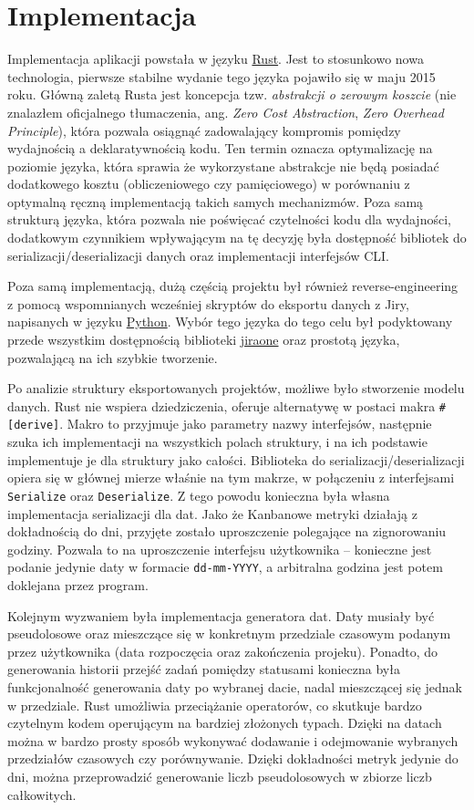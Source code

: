 \section{Implementacja}
Implementacja aplikacji powstała w języku \href{https://www.rust-lang.org/}{Rust}.
Jest to stosunkowo nowa technologia, pierwsze stabilne wydanie tego języka pojawiło się w maju 2015 roku.
Główną zaletą Rusta jest koncepcja tzw. \textit{abstrakcji o zerowym koszcie} (nie znalazłem oficjalnego tłumaczenia, ang. \textit{Zero Cost Abstraction}, \textit{Zero Overhead Principle}), która pozwala
osiągnąć zadowalający kompromis pomiędzy wydajnością a deklaratywnością kodu. Ten termin oznacza optymalizację na poziomie języka, która sprawia że wykorzystane abstrakcje nie będą posiadać dodatkowego kosztu (obliczeniowego czy pamięciowego) w porównaniu
z optymalną ręczną implementacją takich samych mechanizmów.
Poza samą strukturą języka, która pozwala nie poświęcać czytelności kodu dla wydajności, dodatkowym czynnikiem wpływającym na tę decyzję była dostępność bibliotek do serializacji/deserializacji danych oraz implementacji interfejsów CLI. \cite{RustSerde} \cite{RustClap}

Poza samą implementacją, dużą częścią projektu był również reverse-engineering z pomocą wspomnianych wcześniej skryptów do eksportu danych z Jiry, napisanych w języku \href{https://www.python.org/}{Python}.
Wybór tego języka do tego celu był podyktowany przede wszystkim dostępnością biblioteki \href{https://pypi.org/project/jiraone/}{jiraone} oraz prostotą języka, pozwalającą na ich szybkie tworzenie.

Po analizie struktury eksportowanych projektów, możliwe było stworzenie modelu danych.
Rust nie wspiera dziedziczenia, oferuje alternatywę w postaci makra \texttt{\#[derive]}. Makro to przyjmuje jako parametry
nazwy interfejsów, następnie szuka ich implementacji na wszystkich polach struktury, i na ich podstawie implementuje je dla struktury jako
całości.
Biblioteka do serializacji/deserializacji opiera się w głównej mierze właśnie na tym makrze, w połączeniu z interfejsami \texttt{Serialize} oraz \texttt{Deserialize}.
Z tego powodu konieczna była własna implementacja serializacji dla dat.
Jako że Kanbanowe metryki działają z dokładnością do dni, przyjęte zostało uproszczenie polegające na zignorowaniu godziny.
Pozwala to na uproszczenie interfejsu użytkownika -- konieczne jest podanie jedynie daty w formacie \texttt{dd-mm-YYYY}, a arbitralna
godzina jest potem doklejana przez program.

Kolejnym wyzwaniem była implementacja generatora dat. Daty musiały być pseudolosowe oraz mieszczące się w konkretnym przedziale czasowym
podanym przez użytkownika (data rozpoczęcia oraz zakończenia projeku). Ponadto, do generowania historii przejść zadań pomiędzy statusami
konieczna była funkcjonalność generowania daty po wybranej dacie, nadal mieszczącej się jednak w przedziale.
Rust umożliwia przeciążanie operatorów, co skutkuje bardzo czytelnym kodem operującym na bardziej złożonych typach.
Dzięki na datach można w bardzo prosty sposób wykonywać dodawanie i odejmowanie wybranych przedziałów czasowych czy porównywanie.
Dzięki dokładności metryk jedynie do dni, można przeprowadzić generowanie liczb pseudolosowych w zbiorze liczb całkowitych.

